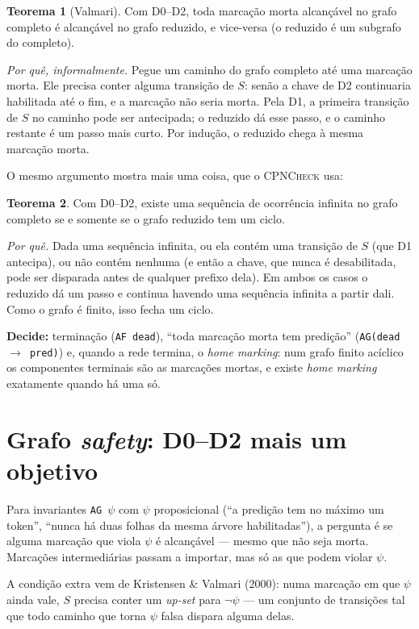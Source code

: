 \documentclass[11pt,a4paper]{report}
\newcommand{\cpn}{\textsc{CPNCheck}}
\newcommand{\code}[1]{\texttt{\small #1}}
\theoremstyle{definition}
\newtheorem{teorema}{Teorema}[chapter]
\begin{document}
\begin{teorema}[Valmari]
Com D0--D2, toda marcação morta alcançável no grafo completo é alcançável no
grafo reduzido, e vice-versa (o reduzido é um subgrafo do completo).
\end{teorema}

\emph{Por quê, informalmente.} Pegue um caminho do grafo completo até uma
marcação morta. Ele precisa conter alguma transição de $S$: senão a chave de
D2 continuaria habilitada até o fim, e a marcação não seria morta. Pela D1, a
primeira transição de $S$ no caminho pode ser antecipada; o reduzido dá esse
passo, e o caminho restante é um passo mais curto. Por indução, o reduzido
chega à mesma marcação morta.

O mesmo argumento mostra mais uma coisa, que o \cpn{} usa:

\begin{teorema}
Com D0--D2, existe uma sequência de ocorrência infinita no grafo completo se e
somente se o grafo reduzido tem um ciclo.
\end{teorema}

\emph{Por quê.} Dada uma sequência infinita, ou ela contém uma transição de
$S$ (que D1 antecipa), ou não contém nenhuma (e então a chave, que nunca é
desabilitada, pode ser disparada antes de qualquer prefixo dela). Em ambos os
casos o reduzido dá um passo e continua havendo uma sequência infinita a
partir dali. Como o grafo é finito, isso fecha um ciclo.

\textbf{Decide:} terminação (\code{AF dead}), ``toda marcação morta tem
predição'' (\code{AG(dead $\to$ pred)}) e, quando a rede termina, o \emph{home
marking}: num grafo finito acíclico os componentes terminais são as marcações
mortas, e existe \emph{home marking} exatamente quando há uma só.

\section{Grafo \emph{safety}: D0--D2 mais um objetivo}

Para invariantes \code{AG $\psi$} com $\psi$ proposicional (``a predição tem no
máximo um token'', ``nunca há duas folhas da mesma árvore habilitadas''), a
pergunta é se alguma marcação que viola $\psi$ é alcançável --- mesmo que não
seja morta. Marcações intermediárias passam a importar, mas só as que podem
violar $\psi$.

A condição extra vem de Kristensen \& Valmari (2000): numa marcação em que
$\psi$ ainda vale, $S$ precisa conter um \emph{up-set} para $\neg\psi$ ---
um conjunto de transições tal que todo caminho que torna $\psi$ falsa dispara
alguma delas.
\end{document}
